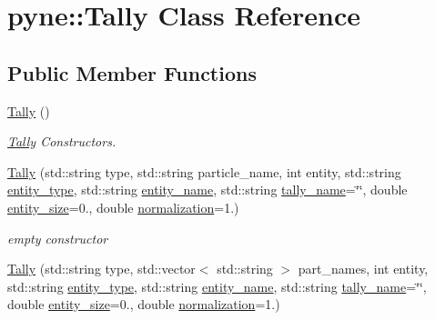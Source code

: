 \hypertarget{classpyne_1_1_tally}{}\section{pyne\+:\+:Tally Class Reference}
\label{classpyne_1_1_tally}
\subsection*{Public Member Functions}
\begin{DoxyCompactItemize}
\item 
\mbox{\label{classpyne_1_1_tally_ad4ad9718cbb925a293dd3450ab3245b0}} 
\hyperlink{classpyne_1_1_tally_ad4ad9718cbb925a293dd3450ab3245b0}{Tally} ()
\begin{DoxyCompactList}\small\item\em \hyperlink{classpyne_1_1_tally}{Tally} Constructors. \end{DoxyCompactList}\item 
\hyperlink{classpyne_1_1_tally_a882081e3a6f1628d1b7941003d5ccfad}{Tally} (std\+::string type, std\+::string particle\+\_\+name, int entity, std\+::string \hyperlink{classpyne_1_1_tally_a8b2e517c759ca71bc7b25c4de5a412f9}{entity\+\_\+type}, std\+::string \hyperlink{classpyne_1_1_tally_ac7892546a42be1385f0e805638a124b1}{entity\+\_\+name}, std\+::string \hyperlink{classpyne_1_1_tally_af5e75c809e337a06d26636020d3f1809}{tally\+\_\+name}=\char`\"{}\char`\"{}, double \hyperlink{classpyne_1_1_tally_a1a19c1b79ed25ea2a3d08b15b30bbea1}{entity\+\_\+size}=0., double \hyperlink{classpyne_1_1_tally_a8ff1eb44926ad1e415386983679c78f1}{normalization}=1.)
\begin{DoxyCompactList}\small\item\em empty constructor \end{DoxyCompactList}\item 
\hyperlink{classpyne_1_1_tally_a73aea38f3ddebff9e67c9b6e9e73b760}{Tally} (std\+::string type, std\+::vector$<$ std\+::string $>$ part\+\_\+names, int entity, std\+::string \hyperlink{classpyne_1_1_tally_a8b2e517c759ca71bc7b25c4de5a412f9}{entity\+\_\+type}, std\+::string \hyperlink{classpyne_1_1_tally_ac7892546a42be1385f0e805638a124b1}{entity\+\_\+name}, std\+::string \hyperlink{classpyne_1_1_tally_af5e75c809e337a06d26636020d3f1809}{tally\+\_\+name}=\char`\"{}\char`\"{}, double \hyperlink{classpyne_1_1_tally_a1a19c1b79ed25ea2a3d08b15b30bbea1}{entity\+\_\+size}=0., double \hyperlink{classpyne_1_1_tally_a8ff1eb44926ad1e415386983679c78f1}{normalization}=1.)

\end{DoxyCompactItemize}
